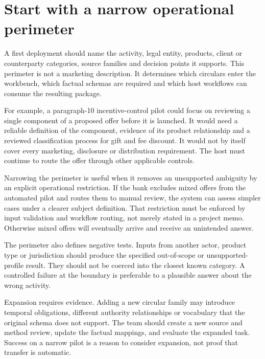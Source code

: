 

\section{Start with a narrow operational perimeter}
\label{merge:M10:01}


A first deployment should name the activity, legal entity, products, client or
counterparty categories, source families and decision points it supports. This
perimeter is not a marketing description. It determines which circulars enter the
workbench, which factual schemas are required and which host workflows can consume
the resulting package.

For example, a paragraph-10 incentive-control pilot could focus on reviewing a
single component of a proposed offer before it is launched. It would need a
reliable definition of the component, evidence of its product relationship and a
reviewed classification process for gift and fee discount. It would not by itself
cover every marketing, disclosure or distribution requirement. The host must
continue to route the offer through other applicable controls.


Narrowing the perimeter is useful when it removes an unsupported ambiguity by an
explicit operational restriction. If the bank excludes mixed offers from the
automated pilot and routes them to manual review, the system can assess simpler
cases under a clearer subject definition. That restriction must be enforced by
input validation and workflow routing, not merely stated in a project memo.
Otherwise mixed offers will eventually arrive and receive an unintended answer.

The perimeter also defines negative tests. Inputs from another actor, product type
or jurisdiction should produce the specified out-of-scope or unsupported-profile
result. They should not be coerced into the closest known category. A controlled
failure at the boundary is preferable to a plausible answer about the wrong
activity.

Expansion requires evidence. Adding a new circular family may introduce temporal
obligations, different authority relationships or vocabulary that the original
schema does not support. The team should create a new source and method review,
update the factual mappings, and evaluate the expanded task. Success on a narrow
pilot is a reason to consider expansion, not proof that transfer is automatic.

